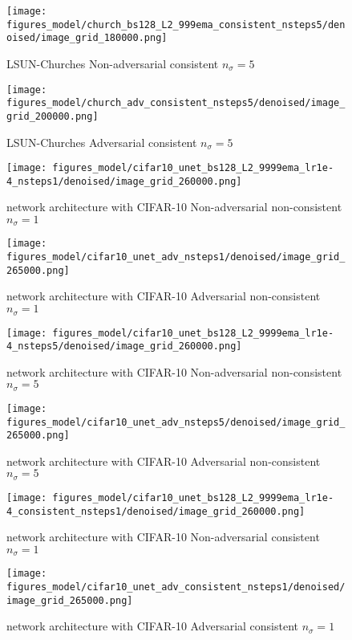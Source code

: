 \documentclass{article} \usepackage{iclr2021_conference_notitle,times}
\theoremstyle{definition}
\theoremstyle{definition}
\begin{document}
\begin{figure}[ht] 
    \centering
    \texttt{[image: figures\_model/church\_bs128\_L2\_999ema\_consistent\_nsteps5/denoised/image\_grid\_180000.png]}
    \caption{LSUN-Churches Non-adversarial consistent $n_\sigma=5$} 
\end{figure}
\begin{figure}[ht] 
    \centering
    \texttt{[image: figures\_model/church\_adv\_consistent\_nsteps5/denoised/image\_grid\_200000.png]}
    \caption{LSUN-Churches Adversarial consistent $n_\sigma=5$} 
\end{figure}



\begin{figure}[ht] 
    \centering
    \texttt{[image: figures\_model/cifar10\_unet\_bs128\_L2\_9999ema\_lr1e-4\_nsteps1/denoised/image\_grid\_260000.png]}
    \caption{\citet{ho2020denoising} network architecture with CIFAR-10 Non-adversarial non-consistent $n_\sigma=1$} 
\end{figure}
\begin{figure}[ht] 
    \centering
    \texttt{[image: figures\_model/cifar10\_unet\_adv\_nsteps1/denoised/image\_grid\_265000.png]}
    \caption{\citet{ho2020denoising} network architecture with CIFAR-10 Adversarial non-consistent $n_\sigma=1$} 
\end{figure}

\begin{figure}[ht] 
    \centering
    \texttt{[image: figures\_model/cifar10\_unet\_bs128\_L2\_9999ema\_lr1e-4\_nsteps5/denoised/image\_grid\_260000.png]}
    \caption{\citet{ho2020denoising} network architecture with CIFAR-10 Non-adversarial non-consistent $n_\sigma=5$} 
\end{figure}
\begin{figure}[ht] 
    \centering
    \texttt{[image: figures\_model/cifar10\_unet\_adv\_nsteps5/denoised/image\_grid\_265000.png]}
    \caption{\citet{ho2020denoising} network architecture with CIFAR-10 Adversarial non-consistent $n_\sigma=5$} 
\end{figure}

\begin{figure}[ht] 
    \centering
    \texttt{[image: figures\_model/cifar10\_unet\_bs128\_L2\_9999ema\_lr1e-4\_consistent\_nsteps1/denoised/image\_grid\_260000.png]}
    \caption{\citet{ho2020denoising} network architecture with CIFAR-10 Non-adversarial consistent $n_\sigma=1$} 
\end{figure}
\begin{figure}[ht] 
    \centering
    \texttt{[image: figures\_model/cifar10\_unet\_adv\_consistent\_nsteps1/denoised/image\_grid\_265000.png]}
    \caption{\citet{ho2020denoising} network architecture with CIFAR-10 Adversarial consistent $n_\sigma=1$} 
\end{figure}
\end{document}
